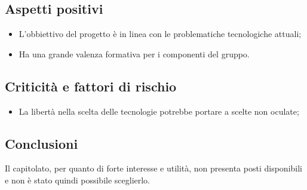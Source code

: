\subsection{Aspetti positivi}
\begin{itemize}
    \item L'obbiettivo del progetto è in linea con le problematiche tecnologiche attuali;
    \item Ha una grande valenza formativa per i componenti del gruppo.
\end{itemize}
\subsection{Criticità e fattori di rischio}
\begin{itemize}
    \item La libertà nella scelta delle tecnologie potrebbe portare a scelte non oculate;
\end{itemize}
\subsection{Conclusioni}
Il capitolato, per quanto di forte interesse e utilità, non presenta posti disponibili e non è stato quindi possibile sceglierlo.